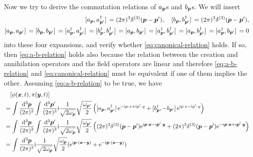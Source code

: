\documentclass[hyperref, a4paper]{article}
\newcommand*{\ii}{\mathrm{i}}
\newcommand*{\ee}{\mathrm{e}}
\begin{document}
\begin{itemize}
    Now we try to derive the commutation relations of $a_{\vb*{p}}$s and $b_{\vb*{p}}$s.
    We will insert 
    \begin{equation}
        \begin{aligned}
            \comm*{a_{\vb*{p}}}{a^\dagger_{\vb*{p}'}} = (2\pi)^3 \delta^{(3)}(\vb*{p} - \vb*{p}'), \quad \comm*{b_{\vb*{p}}}{b^\dagger_{\vb*{p}'}} = (2\pi)^3 \delta^{(3)}(\vb*{p} - \vb*{p}') , \\
            \comm*{a_{\vb*{p}}}{a_{\vb*{p}'}} = \comm*{b_{\vb*{p}}}{b_{\vb*{p}'}} = \comm*{a^\dagger_{\vb*{p}}}{a^\dagger_{\vb*{p}'}} = \comm*{b^\dagger_{\vb*{p}}}{b^\dagger_{\vb*{p}'}} = \comm*{a_{\vb*{p}}}{b_{\vb*{p}'}}  = \comm*{a^\dagger_{\vb*{p}}}{b^\dagger_{\vb*{p}'}} = \comm*{a_{\vb*{p}}}{b^\dagger_{\vb*{p}'}} = \comm*{a_{\vb*{p}}^\dagger}{b_{\vb*{p}'}} = 0 
        \end{aligned}
        \label{eq:a-b-relation}
    \end{equation}
    into these four expansions, and verify whether \eqref{eq:canonical-relation} holds.
    If so, then \eqref{eq:a-b-relation} holds also because the relation between the creation and annihilation operators and the field operators are linear and therefore \eqref{eq:a-b-relation} and \eqref{eq:canonical-relation} must be equivalent if one of them implies the other.
    Assuming \eqref{eq:a-b-relation} to be true, we have 
    \[
        \begin{aligned}
            &\quad \comm*{\phi(\vb*{x}, t)}{\pi(\vb*{y}, t)} \\
            &= \int \frac{\dd[3]{\vb*{p}}}{(2\pi)^3} \int \frac{\dd[3]{\vb*{p}'}}{(2\pi)^3} \ii \frac{1}{\sqrt{2 \omega_{\vb*{p}}}} \sqrt{\frac{\omega_{\vb*{p}'}}{2}} \left( \comm*{a_{\vb*{p}}}{ a^\dagger_{\vb*{p}'}} \ee^{- \ii p \cdot x + \ii p' \cdot y} + \comm*{b^\dagger_{\vb*{p}}}{- b_{\vb*{p}'}} \ee^{\ii p \cdot x - \ii p' \cdot y} \right) \\
            &= \int \frac{\dd[3]{\vb*{p}}}{(2\pi)^3} \int \frac{\dd[3]{\vb*{p}'}}{(2\pi)^3} \ii \frac{1}{\sqrt{2 \omega_{\vb*{p}}}} \sqrt{\frac{\omega_{\vb*{p}'}}{2}} \left( (2\pi)^3 \delta^{(3)}(\vb*{p} - \vb*{p}') \ee^{\ii \vb*{p} \cdot \vb*{x} - \ii \vb*{p}' \cdot \vb*{y}} + (2\pi)^3 \delta^{(3)}(\vb*{p} - \vb*{p}') \ee^{- \ii \vb*{p} \cdot \vb*{x} + \ii \vb*{p}' \cdot \vb*{y}} \right) \\
            &= \int \frac{\dd[3]{\vb*{p}}}{(2\pi)^3} \ii \frac{1}{\sqrt{2\omega_{\vb*{p}}}} \sqrt{\frac{\omega_{\vb*{p}}}{2}} (\ee^{\ii \vb*{p} \cdot (\vb*{x} - \vb*{y})} + \ee^{- \ii \vb*{p} \cdot (\vb*{x} - \vb*{y})}) \\

\end{aligned}\]
\end{itemize}
\end{document}
